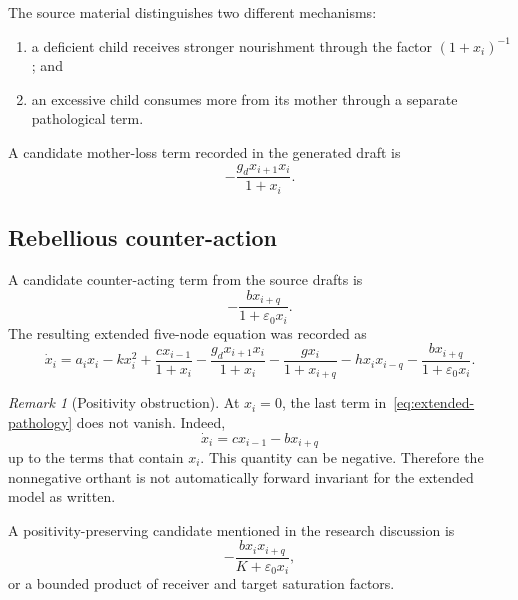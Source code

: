 \documentclass[11pt, reqno]{amsart}
\theoremstyle{definition}
\theoremstyle{remark}
\newtheorem{remark}[theorem]{Remark}
\newcommand{\eps}{\varepsilon}
\begin{document}
	The source material distinguishes two different mechanisms:
	\begin{enumerate}[label=(\roman*),leftmargin=2.5em]
		\item a deficient child receives stronger nourishment through the factor
		$(1+x_i)^{-1}$; and
		\item an excessive child consumes more from its mother through a separate
		pathological term.
	\end{enumerate}
	A candidate mother-loss term recorded in the generated draft is
	\begin{equation}
		\label{eq:overdraw-term}
		-\frac{g_d x_{i+1}x_i}{1+x_i}.
	\end{equation}
	
	\subsection{Rebellious counter-action}
	
	A candidate counter-acting term from the source drafts is
	\begin{equation}
		\label{eq:wu-term-original}
		-\frac{b x_{i+q}}{1+\eps_0x_i}.
	\end{equation}
	The resulting extended five-node equation was recorded as
	\begin{equation}
		\label{eq:extended-pathology}
		\dot x_i
		=
		a_i x_i-kx_i^2
		+\frac{c x_{i-1}}{1+x_i}
		-\frac{g_d x_{i+1}x_i}{1+x_i}
		-\frac{g x_i}{1+x_{i+q}}
		-h x_i x_{i-q}
		-\frac{b x_{i+q}}{1+\eps_0x_i}.
	\end{equation}
	
	\begin{remark}[Positivity obstruction]
		At $x_i=0$, the last term in~\eqref{eq:extended-pathology} does not vanish.
		Indeed,
		\[
		\dot x_i
		=
		c x_{i-1}-b x_{i+q}
		\]
		up to the terms that contain $x_i$.  This quantity can be negative.  Therefore
		the nonnegative orthant is not automatically forward invariant for the
		extended model as written.
	\end{remark}
	
	A positivity-preserving candidate mentioned in the research discussion is
	\begin{equation}
		\label{eq:wu-positive-candidate}
		-\frac{b x_i x_{i+q}}{K+\eps_0x_i},
	\end{equation}
	or a bounded product of receiver and target saturation factors.
	
	
\end{document}
